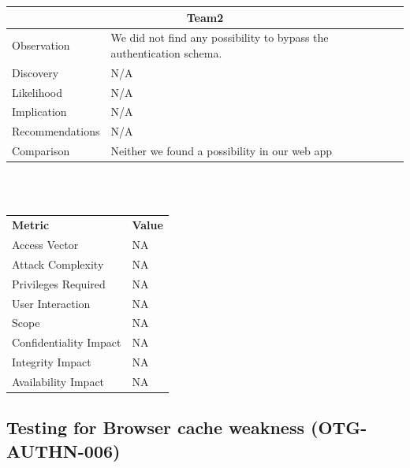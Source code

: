 \documentclass[headsepline,footsepline,footinclude=false,oneside,fontsize=11pt,paper=a4,listof=totoc,bibliography=totoc]{scrbook} %
\begin{document}
\begin{tabular}{ l|p{11cm}  }
	\hline
	\multicolumn{2}{c}{\textbf{Team2}} \\
	\hline
	Observation &  We did not find any possibility to bypass the authentication schema.\\
	Discovery & N/A\\
	Likelihood & N/A\\
	Implication & N/A\\
	Recommendations & N/A\\
	Comparison & Neither we found a possibility in our web app \\
	\hline
\end{tabular}
\\
\vspace{0.5cm}
\\
\begin{center}
	\begin{tabular}{ll}
		\rowcolor[HTML]{34CDF9}
		{\color[HTML]{ECF4FF} \textbf{Metric}}        & {\color[HTML]{ECF4FF} \textbf{Value}} \\
		\rowcolor[HTML]{BBDAFF}
		{\color[HTML]{333333} Access Vector}          & {\color[HTML]{333333} } NA              \\
		\rowcolor[HTML]{ECF4FF}
		{\color[HTML]{333333} Attack Complexity}      & {\color[HTML]{333333} } NA              \\
		\rowcolor[HTML]{BBDAFF}
		{\color[HTML]{333333} Privileges Required}    & {\color[HTML]{333333} } NA              \\
		\rowcolor[HTML]{ECF4FF}
		{\color[HTML]{333333} User Interaction}       & {\color[HTML]{333333} } NA              \\
		\rowcolor[HTML]{BBDAFF}
		{\color[HTML]{333333} Scope}                  & {\color[HTML]{333333} } NA              \\
		\rowcolor[HTML]{ECF4FF}
		{\color[HTML]{333333} Confidentiality Impact} & {\color[HTML]{333333} } NA              \\
		\rowcolor[HTML]{BBDAFF}
		{\color[HTML]{333333} Integrity Impact}       & {\color[HTML]{333333} } NA              \\
		\rowcolor[HTML]{ECF4FF}
		{\color[HTML]{333333} Availability Impact}    & {\color[HTML]{333333} } NA
	\end{tabular}
\end{center}

\pagebreak
\subsection{Testing for Browser cache weakness (OTG-AUTHN-006)}\
\end{document}
